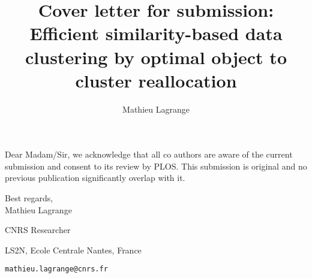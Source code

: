 \documentclass[10pt]{article}
\title{Cover letter for submission: \\
Efficient similarity-based data clustering by optimal object to cluster reallocation}
\author{Mathieu Lagrange}
\begin{document}
\maketitle

Dear Madam/Sir, we acknowledge that all co authors are aware of the current submission and consent to its review by PLOS. This submission is original and no previous publication significantly overlap with it.

Best regards,\\

Mathieu Lagrange

CNRS Researcher

LS2N, Ecole Centrale Nantes, France

\texttt{mathieu.lagrange@cnrs.fr}
\end{document}
